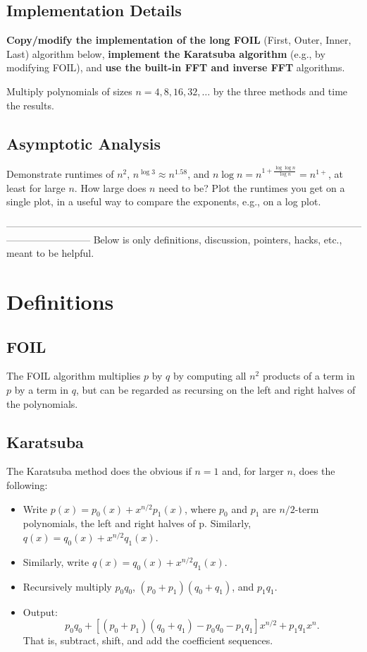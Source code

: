 \documentclass[lang=cn,11pt]{elegantbook}
\begin{document}
\subsection*{Implementation Details}

\textbf{Copy/modify the implementation of the long FOIL} (First, Outer, Inner, Last) algorithm below, \textbf{implement the Karatsuba algorithm} (e.g., by modifying FOIL), and \textbf{use the built-in FFT and inverse FFT} algorithms.

Multiply polynomials of sizes $n = 4, 8, 16, 32, \dots$ by the three methods and time the results.

\subsection*{Asymptotic Analysis}

Demonstrate runtimes of $n^2$, $n^{\log 3} \approx n^{1.58}$, and $n \log n = n^{1 + \frac{\log \log n}{\log n}} = n^{1+}$, at least for large $n$. How large does $n$ need to be? Plot the runtimes you get on a single plot, in a useful way to compare the exponents, e.g., on a log plot.

\noindent --------------------------------------------------------------------------------------------------------------------------------------
Below is only definitions, discussion, pointers, hacks, etc., meant to be helpful.

\section*{Definitions}
\subsection*{FOIL}

The FOIL algorithm multiplies $p$ by $q$ by computing all $n^2$ products of a term in $p$ by a term in $q$, but can be regarded as recursing on the left and right halves of the polynomials.

\subsection*{Karatsuba}

The Karatsuba method does the obvious if $n=1$ and, for larger $n$, does the following:

\begin{itemize}
    \item Write $p(x) = p_0(x) + x^{n/2}p_1(x)$, where $p_0$ and $p_1$ are $n/2$-term polynomials, the left and right halves of p. Similarly, $q(x) = q_0(x) + x^{n/2} q_1(x)$.
    \item Similarly, write $q(x) = q_0(x) + x^{n/2}q_1(x)$.
    \item Recursively multiply $p_0q_0$, $(p_0 + p_1)(q_0 + q_1)$, and $p_1q_1$.
    \item Output:
    \[
    p_0q_0 + [(p_0 + p_1)(q_0 + q_1) - p_0q_0 - p_1q_1]x^{n/2} + p_1q_1x^n.
    \] That is, subtract, shift, and add the coefficient sequences.
\end{itemize}
\end{document}
